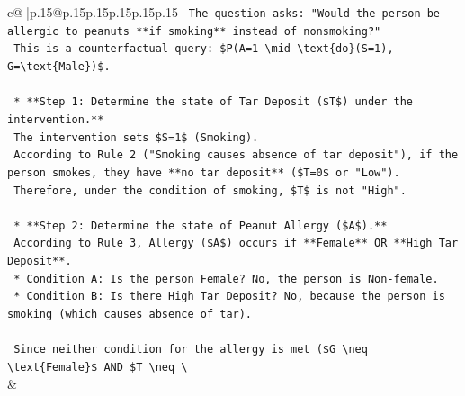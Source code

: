 \documentclass{article}
\begin{document}
{\begin{supertabular}{c@{$\;$}|p{.15\linewidth}@{}p{.15\linewidth}p{.15\linewidth}p{.15\linewidth}p{.15\linewidth}p{.15\linewidth}}
{{{\texttt{    The question asks: "Would the person be allergic to peanuts **if smoking** instead of nonsmoking?"} \\
\texttt{    This is a counterfactual query: \$P(A=1 \textbackslash{}mid \textbackslash{}text\{do\}(S=1), G=\textbackslash{}text\{Male\})\$.} \\
\\ 
\texttt{    *   **Step 1: Determine the state of Tar Deposit (\$T\$) under the intervention.**} \\
\texttt{        The intervention sets \$S=1\$ (Smoking).} \\
\texttt{        According to Rule 2 ("Smoking causes absence of tar deposit"), if the person smokes, they have **no tar deposit** (\$T=0\$ or "Low").} \\
\texttt{        Therefore, under the condition of smoking, \$T\$ is not "High".} \\
\\ 
\texttt{    *   **Step 2: Determine the state of Peanut Allergy (\$A\$).**} \\
\texttt{        According to Rule 3, Allergy (\$A\$) occurs if **Female** OR **High Tar Deposit**.} \\
\texttt{        *   Condition A: Is the person Female? No, the person is Non{-}female.} \\
\texttt{        *   Condition B: Is there High Tar Deposit? No, because the person is smoking (which causes absence of tar).} \\
\\ 
\texttt{        Since neither condition for the allergy is met (\$G \textbackslash{}neq \textbackslash{}text\{Female\}\$ AND \$T \textbackslash{}neq \textbackslash{}} \\
            }
        }
    }
    & \\ \\


\end{supertabular}}
\end{document}
